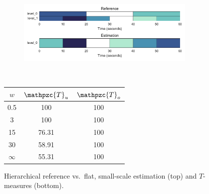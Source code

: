 \documentclass{article}
\def\shag{\ensuremath{\mathpzc{T}}}
\begin{document}
\begin{figure}[t]
  \centering
  \begin{subfigure}{0.5\textwidth}
    \centering
    \includegraphics[width=0.94\textwidth]{figs/hier-flatsmall.pdf}
  \end{subfigure}%
  \\
  \begin{minipage}{0.5\textwidth}
    \centering
    \vspace{10pt}
    \begin{tabular}{|c|c|c|}
      \hline
      $w$       & $\shag_u$    & $\shag_o$      \\
      \hline
      0.5       & 100       & 100      \\     
      3         & 100       & 100      \\
      15        & 76.31     & 100    \\
      30        & 58.91     & 100    \\
      $\infty$  & 55.31     & 100    \\
      \hline
    \end{tabular}
  \end{minipage}
  \caption{Hierarchical reference vs.\ flat, small-scale estimation (top) and $T$-measures (bottom).}
  \label{fig:hier-flatsmall}
\end{figure}
\end{document}
